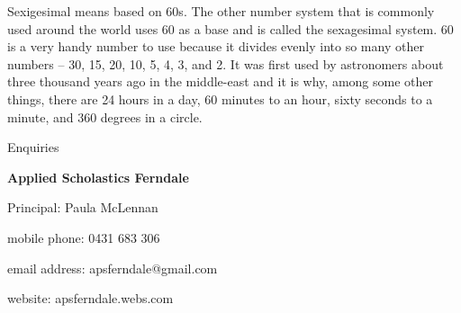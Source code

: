 \documentclass{article}
\begin{document}
Sexigesimal means based on 60s. The other number system that is commonly used around the world uses 60 as a base and is called the sexagesimal system. 60 is a very handy number to use because it divides evenly into so many other numbers – 30, 15, 20, 10, 5, 4, 3, and 2. It was first used by astronomers about three thousand years ago in the middle-east and it is why, among some other things, there are 24 hours in a day, 60 minutes to an hour, sixty seconds to a minute, and 360 degrees in a circle.
\newpage
\
\newpage
\
\newpage
\
\newpage
\
\newpage
\
\newpage
\
\newpage
\
\newpage
\

\begin{center}
\linespread{2}\large

Enquiries

\textbf{Applied Scholastics Ferndale}

Principal: Paula McLennan

mobile phone: 0431 683 306

email address: apsferndale@gmail.com

website: apsferndale.webs.com
\end{center}
\end{document}
